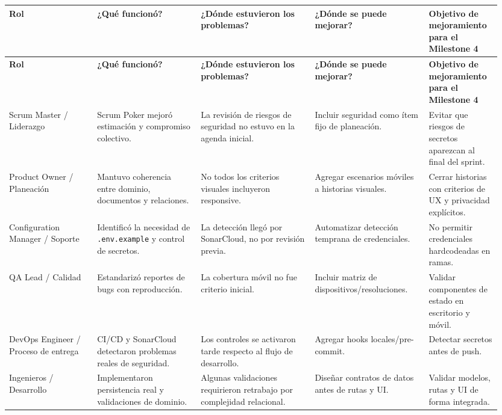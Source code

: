 \documentclass[11pt,a4paper]{article}
\begin{document}
\begin{landscape}
\begingroup
\tiny
\setlength{\tabcolsep}{3pt}
\begin{longtable}{P{0.17\linewidth}P{0.20\linewidth}P{0.22\linewidth}P{0.22\linewidth}P{0.14\linewidth}}
\toprule
\textbf{Rol} & \textbf{¿Qué funcionó?} & \textbf{¿Dónde estuvieron los problemas?} & \textbf{¿Dónde se puede mejorar?} & \textbf{Objetivo de mejoramiento para el Milestone 4} \\
\midrule
\endfirsthead
\toprule
\textbf{Rol} & \textbf{¿Qué funcionó?} & \textbf{¿Dónde estuvieron los problemas?} & \textbf{¿Dónde se puede mejorar?} & \textbf{Objetivo de mejoramiento para el Milestone 4} \\
\midrule
\endhead
\bottomrule
\endlastfoot
Scrum Master / Liderazgo & Scrum Poker mejoró estimación y compromiso colectivo. & La revisión de riesgos de seguridad no estuvo en la agenda inicial. & Incluir seguridad como ítem fijo de planeación. & Evitar que riesgos de secretos aparezcan al final del sprint. \\
Product Owner / Planeación & Mantuvo coherencia entre dominio, documentos y relaciones. & No todos los criterios visuales incluyeron responsive. & Agregar escenarios móviles a historias visuales. & Cerrar historias con criterios de UX y privacidad explícitos. \\
Configuration Manager / Soporte & Identificó la necesidad de \texttt{.env.example} y control de secretos. & La detección llegó por SonarCloud, no por revisión previa. & Automatizar detección temprana de credenciales. & No permitir credenciales hardcodeadas en ramas. \\
QA Lead / Calidad & Estandarizó reportes de bugs con reproducción. & La cobertura móvil no fue criterio inicial. & Incluir matriz de dispositivos/resoluciones. & Validar componentes de estado en escritorio y móvil. \\
DevOps Engineer / Proceso de entrega & CI/CD y SonarCloud detectaron problemas reales de seguridad. & Los controles se activaron tarde respecto al flujo de desarrollo. & Agregar hooks locales/pre-commit. & Detectar secretos antes de push. \\
Ingenieros / Desarrollo & Implementaron persistencia real y validaciones de dominio. & Algunas validaciones requirieron retrabajo por complejidad relacional. & Diseñar contratos de datos antes de rutas y UI. & Validar modelos, rutas y UI de forma integrada. \\
\end{longtable}
\endgroup
\end{landscape}
\end{document}
